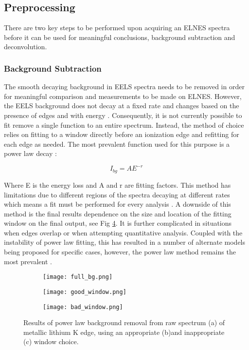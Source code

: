 \subsection{Preprocessing}

There are two key steps to be performed upon acquiring an ELNES spectra before it can be used for meaningful conclusions, background subtraction and deconvolution. 





\subsubsection{Background Subtraction} \label{bg_section}
The smooth decaying background in EELS spectra needs to be removed in order for meaningful comparison and measurements to be made on ELNES.  However, the EELS background does not decay at a fixed rate and changes based on the presence of edges and with energy \cite{new_bg}. Consequently, it is not currently possible to fit remove a single function to an entire spectrum.  Instead, the method of choice relies on fitting to a window directly before an ionization edge and refitting for each edge as needed.  The most prevalent function used for this purpose is a power law decay \cite{Egerton}: 

\begin{equation}
	I_{bg} = AE^{-r}
\end{equation}


Where E is the energy loss and A and r are fitting factors.  This method has limitations due to different regions of the spectra decaying at different rates which means a fit must be performed for every analysis \cite{verbeeck_model_2004, egerton_inelastic_1975}.  A downside of this method is the final results dependence on the size and location of the fitting window on the final output, see Fig \ref{bg_removal}.  It is further complicated in situations when edges overlap or when attempting quantitative analysis.  Coupled with the instability of power law fitting, this has resulted in a number of alternate models being proposed for specific cases, however, the power law method remains the most prevalent \cite{verbeeck_model_2004, riedl_extraction_2006}.  

\begin{figure}
	\centering
	\begin{subfigure}{0.45\textwidth}
		\texttt{[image: full\_bg.png]} 
		\caption{}
		\label{full_bg}
	\end{subfigure}
	\hfill
	
	\begin{subfigure}{0.45\textwidth}
		\texttt{[image: good\_window.png]} 
		\caption{}
		\label{good_window}
	\end{subfigure}
	\begin{subfigure}{0.45\textwidth}
		\texttt{[image: bad\_window.png]} 
		\caption{}
		\label{bad_window}
	\end{subfigure}
	\caption{Results of power law background removal from raw spectrum (a) of metallic lithium K edge, using an appropriate (b)and inappropriate (c) window choice.}
	\label{bg_removal}
\end{figure}

